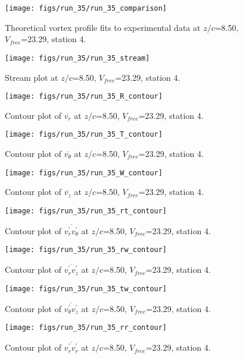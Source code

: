 \begin{figure}[H]
\centering
\texttt{[image: figs/run\_35/run\_35\_comparison]}
\caption{Theoretical vortex profile fits to experimental data at $z/c$=8.50, $V_{free}$=23.29, station 4.}
\end{figure}


\begin{figure}[H]
\centering
\texttt{[image: figs/run\_35/run\_35\_stream]}
\caption{Stream plot at $z/c$=8.50, $V_{free}$=23.29, station 4.}
\end{figure}


\begin{figure}[H]
\centering
\texttt{[image: figs/run\_35/run\_35\_R\_contour]}
\caption{Contour plot of $\overline{v_{r}}$ at $z/c$=8.50, $V_{free}$=23.29, station 4.}
\end{figure}


\begin{figure}[H]
\centering
\texttt{[image: figs/run\_35/run\_35\_T\_contour]}
\caption{Contour plot of $\overline{v_{\theta}}$ at $z/c$=8.50, $V_{free}$=23.29, station 4.}
\end{figure}


\begin{figure}[H]
\centering
\texttt{[image: figs/run\_35/run\_35\_W\_contour]}
\caption{Contour plot of $\overline{v_{z}}$ at $z/c$=8.50, $V_{free}$=23.29, station 4.}
\end{figure}


\begin{figure}[H]
\centering
\texttt{[image: figs/run\_35/run\_35\_rt\_contour]}
\caption{Contour plot of $\overline{v_{r}^{\prime} v_{\theta}^{\prime}}$ at $z/c$=8.50, $V_{free}$=23.29, station 4.}
\end{figure}


\begin{figure}[H]
\centering
\texttt{[image: figs/run\_35/run\_35\_rw\_contour]}
\caption{Contour plot of $\overline{v_{r}^{\prime} v_{z}^{\prime}}$ at $z/c$=8.50, $V_{free}$=23.29, station 4.}
\end{figure}


\begin{figure}[H]
\centering
\texttt{[image: figs/run\_35/run\_35\_tw\_contour]}
\caption{Contour plot of $\overline{v_{\theta}^{\prime} v_{z}^{\prime}}$ at $z/c$=8.50, $V_{free}$=23.29, station 4.}
\end{figure}


\begin{figure}[H]
\centering
\texttt{[image: figs/run\_35/run\_35\_rr\_contour]}
\caption{Contour plot of $\overline{v_{r}^{\prime} v_{r}^{\prime}}$ at $z/c$=8.50, $V_{free}$=23.29, station 4.}
\end{figure}


